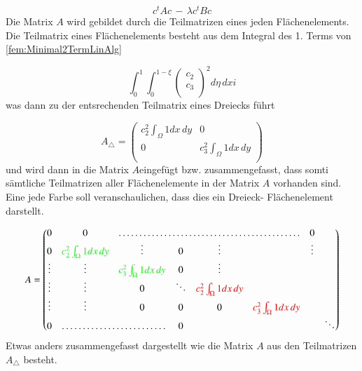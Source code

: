 \begin{equation}
			c^t Ac \, - \, \lambda c^t Bc
			\label{fem:Minimal2LinAlg}
\end{equation}
Die Matrix $A$ wird gebildet durch die Teilmatrizen eines jeden Flächenelements. Die Teilmatrix eines Flächenelements besteht  aus dem Integral des 1. Terms von \ref{fem:Minimal2TermLinAlg} 

\begin{equation}
			\int_0^1 \int_0^{1 - \xi} \left( \begin{array}{c} c_2 \\ c_3\\	
\end{array} \right)^2 d\eta \, dxi
			\label{fem:Minimal2LinAlgA}
\end{equation}
was dann zu der entsrechenden Teilmatrix eines Dreiecks führt

\begin{equation}
	A_{\triangle} = \left( \begin{array}{cc}
	c_2^2 \int_{\Omega} 1 dx \, dy & 0  \\ 
	0 & c_3^2 \int_{\Omega} 1 dx \, dy  \\
	\end{array}\right)
	\label{fem:TeilmatrixA}
\end{equation}
und wird dann in die Matrix $A $eingefügt bzw. zusammengefasst, dass  somti sämtliche Teilmatrizen aller Flächenelemente in der Matrix $A$ vorhanden sind. Eine jede Farbe soll veranschaulichen, dass dies ein Dreieck- Flächenelement darstellt.

\begin{equation}
 A = \begin{pmatrix} 0 & 0 & \hdotsfor{4} & 0 \\
	0 & \textcolor{green}{ c_2^2 \int_{\Omega} 1 dx \, dy }& \vdots & 0 & \vdots & & \vdots \\
	\vdots & \vdots & \textcolor{green}{c_3^2 \int_{\Omega} 1 dx \, dy }& 0 & \vdots  & & \\
	\vdots & \vdots & 0 & \ddots & \textcolor{red}{ c_2^2 \int_{\Omega} 1 dx \, dy }& & \\
	\vdots & \vdots & 0 & 0 & 0 & \textcolor{red}{c_3^2 \int_{\Omega} 1 dx \, dy} & \\
	0 & \hdotsfor{2} & 0 &  & & &  \ddots  \\
	\end{pmatrix}
	\label{fem:MatrixA}
\end{equation}
Etwas anders zusammengefasst dargestellt wie die Matrix $A$ aus den Teilmatrizen $A_{\triangle}$ besteht.

